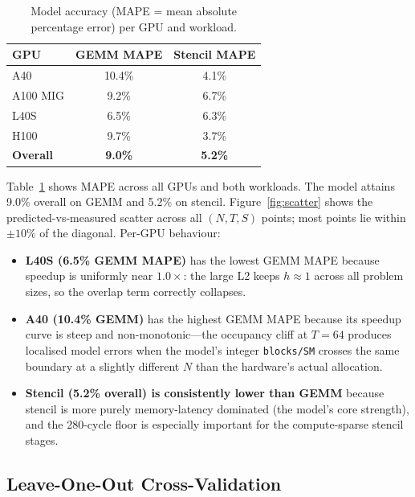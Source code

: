 \documentclass[10pt,twocolumn]{article}
\newcommand{\highlight}[1]{\colorbox{ummaize!35}{\textbf{#1}}}
\begin{document}
\begin{table}[h]
\centering
\small
\caption{Model accuracy (MAPE = mean absolute percentage error) per
GPU and workload.}
\label{tab:mape}
\renewcommand{\arraystretch}{1.2}
\begin{tabular}{@{}lcc@{}}
\toprule
\textbf{GPU} & \textbf{GEMM MAPE} & \textbf{Stencil MAPE} \\
\midrule
A40              & 10.4\% & 4.1\% \\
A100 MIG         &  9.2\% & 6.7\% \\
L40S             &  6.5\% & 6.3\% \\
H100             &  9.7\% & 3.7\% \\
\midrule
\rowcolor{ummaize!20}
\textbf{Overall} & \highlight{9.0\%} & \highlight{5.2\%} \\
\bottomrule
\end{tabular}
\end{table}

Table~\ref{tab:mape} shows MAPE across all GPUs and both workloads.
The model attains 9.0\% overall on GEMM and 5.2\% on stencil.
Figure~\ref{fig:scatter} shows the predicted-vs-measured scatter
across all $(N, T, S)$ points; most points lie within
$\pm 10\%$ of the diagonal.  Per-GPU behaviour:

\begin{itemize}
\item \textbf{L40S (6.5\% GEMM MAPE)} has the lowest GEMM MAPE
  because speedup is uniformly near $1.0\times$: the large L2
  keeps $h \approx 1$ across all problem sizes, so the overlap term
  correctly collapses.
\item \textbf{A40 (10.4\% GEMM)} has the highest GEMM MAPE because
  its speedup curve is steep and non-monotonic---the occupancy
  cliff at $T = 64$ produces localised model errors when the
  model's integer \texttt{blocks/SM} crosses the same boundary at a
  slightly different $N$ than the hardware's actual allocation.
\item \textbf{Stencil (5.2\% overall) is consistently lower than
  GEMM} because stencil is more purely memory-latency dominated
  (the model's core strength), and the 280-cycle floor is
  especially important for the compute-sparse stencil stages.
\end{itemize}

\subsection{Leave-One-Out Cross-Validation}
\end{document}

